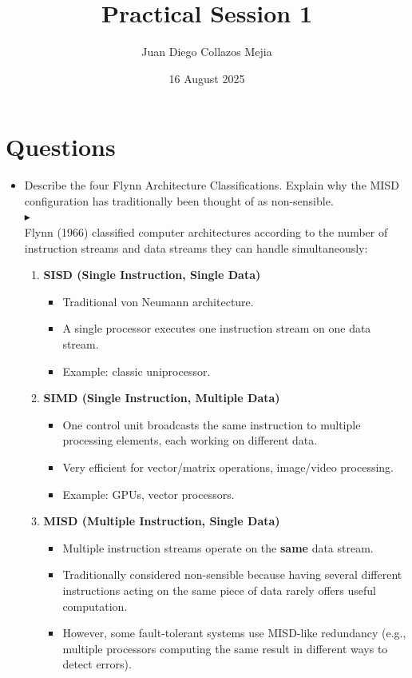 \documentclass[12pt]{article}
\title{Practical Session 1}
\author{Juan Diego Collazos Mejia}
\date{16 August 2025}
\begin{document}
\maketitle

\section{Questions}

\begin{itemize}[left = 0pt]
    \item Describe the four Flynn Architecture Classifications. Explain why the MISD configuration has traditionally been thought of as non-sensible.\\
    $\blacktriangleright$ \\
    Flynn (1966) classified computer architectures according to the number of instruction streams and data streams they can handle simultaneously:
    \begin{enumerate}
        \item \textbf{SISD (Single Instruction, Single Data) }
        \begin{itemize}
            \item Traditional von Neumann architecture.
            \item A single processor executes one instruction stream on one data stream.
            \item Example: classic uniprocessor.
        \end{itemize}

        \item \textbf{SIMD (Single Instruction, Multiple Data)}
        \begin{itemize}
            \item  One control unit broadcasts the same instruction to multiple processing elements, each working on different data.
           \item Very efficient for vector/matrix operations, image/video processing.
           \item  Example: GPUs, vector processors.
        \end{itemize}

        \item \textbf{MISD (Multiple Instruction, Single Data)}
        \begin{itemize}
            \item Multiple instruction streams operate on the \textbf{same} data stream.
            \item Traditionally considered non-sensible because having several different instructions acting on the same piece of data rarely offers useful computation.
            \item However, some fault-tolerant systems use MISD-like redundancy (e.g., multiple processors computing the same result in different ways to detect errors).
        \end{itemize}


\end{enumerate}
\end{itemize}
\end{document}
